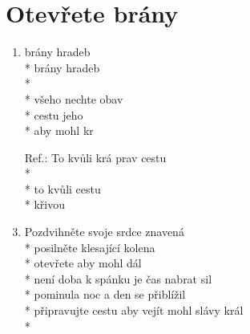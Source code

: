\section{Otevřete brány}
\begin{enumerate}
\item {} brány hradeb  \\*
 brány hradeb  \\*
    \\*
 všeho nechte obav  \\*
 cestu jeho  \\*
  aby  mohl  kr
\item[Ref.:] To kvůli krá prav  cestu \\*
  \\*
to kvůli    cestu \\*
 křivou  
\item Pozdvihněte svoje srdce znavená \\*
posilněte klesající kolena \\*
otevřete aby mohl dál \\*
není doba k spánku je čas nabrat sil \\*
pominula noc a den se přiblížil \\*
připravujte cestu aby vejít mohl slávy král \\*
\end{enumerate}
